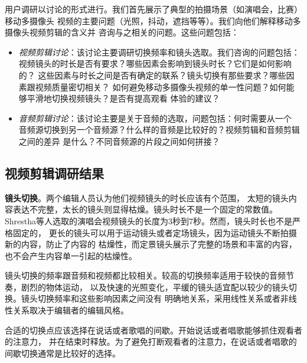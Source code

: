用户调研以讨论的形式进行。我们首先展示了典型的拍摄场景（如演唱会，比赛）移动多摄像头
视频的主要问题（光照，抖动，遮挡等等）。我们向他们解释移动多摄像头视频剪辑的含义并
咨询与之相关的问题。这些问题包括：
\begin{itemize}
    \item \emph{视频剪辑讨论}：该讨论主要调研切换频率和镜头选取。我们咨询的问题包括：
        视频镜头的时长是否有要求？哪些因素会影响到镜头时长？它们是如何影响的？
        这些因素与时长之间是否有确定的联系？镜头切换有那些要求？哪些因素跟视频质量密切相关？
        如何避免移动多摄像头视频的单一性问题？如何能够平滑地切换视频镜头？是否有提高观看
        体验的建议？
    \item \emph{音频剪辑讨论}：该讨论主要是关于音频的选取，问题包括：何时需要从一个
        音频源切换到另一个音频源？什么样的音频是比较好的？视频剪辑和音频剪辑之间的差异
        是什么？不同音频源的片段之间如何拼接？
\end{itemize}

\subsection{视频剪辑调研结果}
\label{sec:video-mashup-survey}
\textbf{镜头切换}。两个编辑人员认为他们视频镜头的时长应该有个范围，
太短的镜头内容表达不完整，太长的镜头则显得枯燥。镜头时长不是一个固定的常数值。
Shrestha等人选取的演唱会视频镜头的长度为3秒到7秒。然而，镜头时长也不是严格固定的，
更长的镜头可以用于运动镜头或者定场镜头，因为运动镜头不断拍摄新的内容，防止了内容的
枯燥性，而定景镜头展示了完整的场景和丰富的内容，也不会产生内容单一引起的枯燥性。

镜头切换的频率跟音频和视频都比较相关。较高的切换频率适用于较快的音频节奏，剧烈的物体运动，
以及快速的光照变化，平缓的镜头适宜配以较少的镜头切换。镜头切换频率和这些影响因素之间没有
明确地关系，采用线性关系或者非线性关系取决于编辑者的编辑风格。

合适的切换点应该选择在说话或者歌唱的间歇。开始说话或者唱歌能够抓住观看者的注意力，
并在结束时释放。为了避免打断观看者的注意力，在说话或者唱歌的间歇切换通常是比较好的选择。

